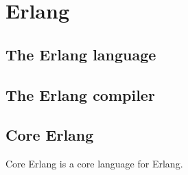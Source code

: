 \section{Erlang}

\subsection{The Erlang language}

\subsection{The Erlang compiler}

\subsection{Core Erlang}
Core Erlang \cite{CoreErlangIntro} is a core language for Erlang.
